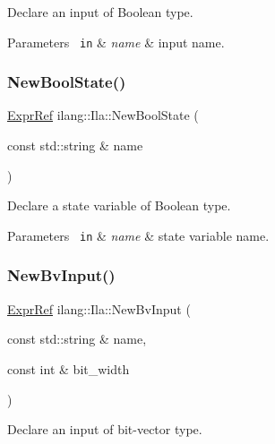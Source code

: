 Declare an input of Boolean type. 


\begin{DoxyParams}[1]{Parameters}
\mbox{\texttt{ in}}  & {\em name} & input name. \\
\hline
\end{DoxyParams}
\mbox{\label{classilang_1_1_ila_aa08f99af425455d098aaae6c139476b0}} 
\subsubsection{\texorpdfstring{New\+Bool\+State()}{NewBoolState()}}
{\footnotesize\ttfamily \mbox{\hyperlink{classilang_1_1_expr_ref}{Expr\+Ref}} ilang\+::\+Ila\+::\+New\+Bool\+State (\begin{DoxyParamCaption}\item[{const std\+::string \&}]{name }\end{DoxyParamCaption})}



Declare a state variable of Boolean type. 


\begin{DoxyParams}[1]{Parameters}
\mbox{\texttt{ in}}  & {\em name} & state variable name. \\
\hline
\end{DoxyParams}
\mbox{\label{classilang_1_1_ila_a22fa6a46415f285a85ad8a02eb55c006}} 
\subsubsection{\texorpdfstring{New\+Bv\+Input()}{NewBvInput()}}
{\footnotesize\ttfamily \mbox{\hyperlink{classilang_1_1_expr_ref}{Expr\+Ref}} ilang\+::\+Ila\+::\+New\+Bv\+Input (\begin{DoxyParamCaption}\item[{const std\+::string \&}]{name,  }\item[{const int \&}]{bit\+\_\+width }\end{DoxyParamCaption})}



Declare an input of bit-\/vector type. 


